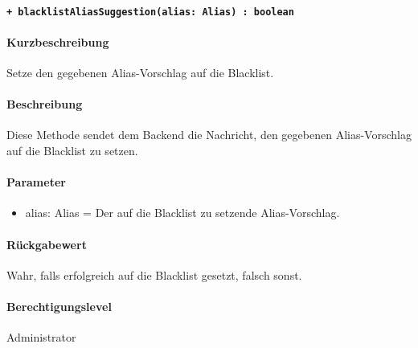 \paragraph{\texttt{+ blacklistAliasSuggestion(alias: Alias) : boolean}}\label{AP_Framework_blacklistAliasSuggestion}%
\paragraph*{Kurzbeschreibung}
Setze den gegebenen Alias-Vorschlag auf die Blacklist.
\paragraph*{Beschreibung}
Diese Methode sendet dem Backend die Nachricht, den gegebenen Alias-Vorschlag auf die Blacklist zu setzen.
\paragraph*{Parameter}
\begin{itemize}
    \item alias: Alias = Der auf die Blacklist zu setzende Alias-Vorschlag.
\end{itemize}
\paragraph*{Rückgabewert}
Wahr, falls erfolgreich auf die Blacklist gesetzt, falsch sonst.
\paragraph*{Berechtigungslevel}
Administrator